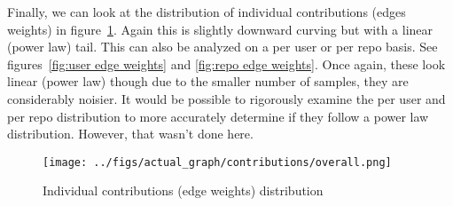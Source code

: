 \documentclass{pset}
\begin{document}
Finally, we can look at the distribution of individual contributions (edges weights)
in figure~\ref{fig:edge weights}.
Again this is slightly downward curving but with a linear (power law) tail.
This can also be analyzed on a per user or per repo basis.
See figures~\ref{fig:user edge weights} and \ref{fig:repo edge weights}.
Once again, these look linear (power law) though due to the smaller number of samples,
they are considerably noisier. It would be possible to rigorously examine
the per user and per repo distribution to more accurately determine if they
follow a power law distribution. However, that wasn't done here.

\begin{figure}[ht]
\centering
\texttt{[image: ../figs/actual\_graph/contributions/overall.png]}
\caption{Individual contributions (edge weights) distribution}\label{fig:edge weights}
\end{figure}




\end{document}

